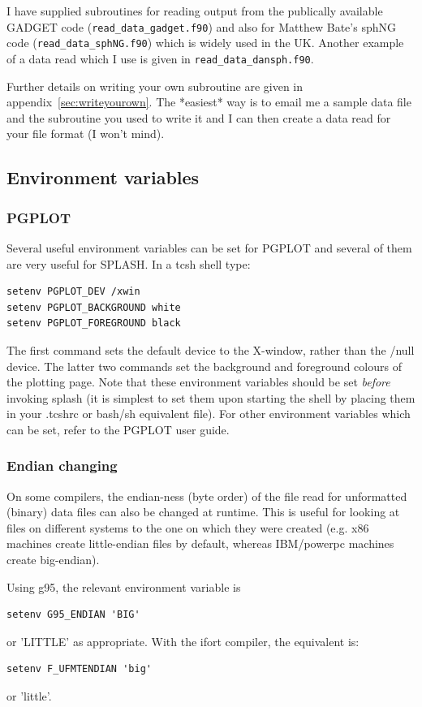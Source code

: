 \documentclass[a4paper,11pt]{article}
\begin{document}
I have supplied subroutines for reading output from the publically available
GADGET code (\verb+read_data_gadget.f90+) and also for Matthew Bate's sphNG code
(\verb+read_data_sphNG.f90+) which is widely used in the UK. Another example of a
data read which I use is given in \verb+read_data_dansph.f90+.

Further details on writing your own subroutine are given in
appendix~\ref{sec:writeyourown}. The *easiest* way is to email me a sample data file and the subroutine
you used to write it and I can then create a data read for your file format (I won't mind).

\subsection{Environment variables}
\label{sec:envvariables}

\subsubsection{ PGPLOT}
 Several useful environment variables can be set for PGPLOT and several of them
are very useful for SPLASH. In a tcsh shell type:
\begin{verbatim}
setenv PGPLOT_DEV /xwin
setenv PGPLOT_BACKGROUND white
setenv PGPLOT_FOREGROUND black
\end{verbatim}
The first command sets the default device to the X-window, rather than the /null
device. The latter two commands set the background and foreground colours of the
plotting page. Note that these environment variables should be set \emph{before}
invoking splash (it is simplest to set them upon starting the shell by placing
them in your .tcshrc or bash/sh equivalent file). For other environment
variables which can be set, refer to the PGPLOT user guide.

\subsubsection{ Endian changing}
 On some compilers, the endian-ness (byte order) of the file read for unformatted (binary) data files can also be changed at runtime. This is useful for looking at files on different systems to the one on which they were created (e.g. x86 machines create little-endian files by default, whereas IBM/powerpc machines create big-endian).
 
  Using g95, the relevant environment variable is
\begin{verbatim}
setenv G95_ENDIAN 'BIG'
\end{verbatim}
or 'LITTLE' as appropriate. With the ifort compiler, the equivalent is:
\begin{verbatim}
setenv F_UFMTENDIAN 'big'
\end{verbatim}
or 'little'. 
\end{document}
